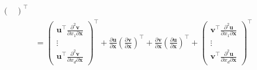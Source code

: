 \documentclass[a4paper]{article}
\begin{document}
{\begin{enumerate}
\begin{align*}
\begin{pmatrix}
                         \end{pmatrix}^\top \\
      &= \begin{pmatrix}
            \mathbf{u}^\top \frac{\partial^2  \mathbf{v}}{\partial x_1\partial \mathbf{x}} \\
            \vdots \\
            \mathbf{u}^\top \frac{\partial^2  \mathbf{v}}{\partial x_d\partial \mathbf{x}}
         \end{pmatrix}^\top
         + \frac{\partial \mathbf{u}}{\partial \mathbf{x}} \left(\frac{\partial \mathbf{v}}{\partial \mathbf{x}}\right)^\top
         + \frac{\partial \mathbf{v}}{\partial \mathbf{x}} \left(\frac{\partial \mathbf{u}}{\partial \mathbf{x}}\right)^\top
         + \begin{pmatrix}
            \mathbf{v}^\top \frac{\partial^2  \mathbf{u}}{\partial x_1\partial \mathbf{x}} \\
            \vdots \\
            \mathbf{v}^\top \frac{\partial^2  \mathbf{u}}{\partial x_d\partial \mathbf{x}} 
           \end{pmatrix}^\top
    \end{align*}
\end{enumerate}
}
\end{document}
